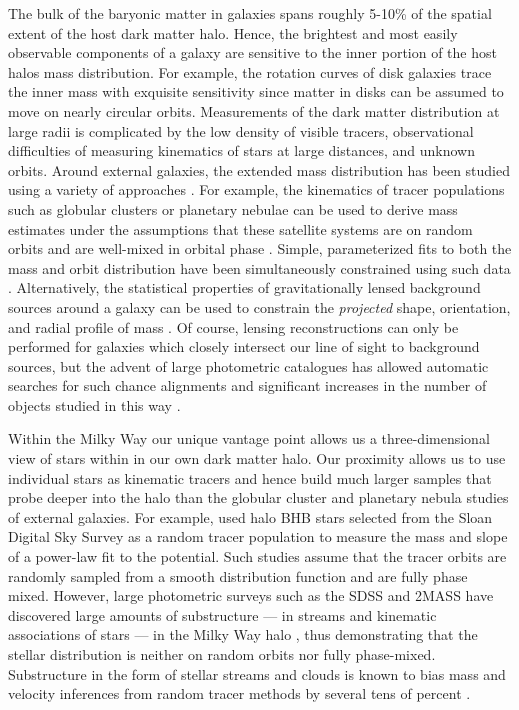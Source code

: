 \documentclass[letterpaper,12pt,preprint]{aastex}
\begin{document}
The bulk of the baryonic matter in galaxies spans roughly 5-10\% of the spatial extent of the host dark matter halo. Hence, the brightest and most easily observable components of a galaxy are sensitive to the inner portion of the host halos mass distribution. For example, the rotation curves of disk galaxies trace the inner mass with exquisite sensitivity since matter in disks can be assumed to move on nearly circular orbits. Measurements of the dark matter distribution at large radii is complicated by the low density of visible tracers, observational difficulties of measuring kinematics of stars at large distances, and unknown orbits. Around external galaxies, the extended mass distribution has been studied using a variety of approaches \citep[see][for a a complete and detailed review]{courteau13}. For example, the kinematics of tracer populations such as globular clusters or planetary nebulae can be used to derive mass estimates under the assumptions that these satellite systems are on random orbits and are well-mixed in orbital phase \citep[early investigations include][]{mendez01,cote03}. Simple, parameterized fits to both the mass and orbit distribution have been simultaneously constrained using such data \citep[e.g.][]{napolitano11,deason12c}. Alternatively, the statistical properties of gravitationally lensed background sources around a galaxy can be used to constrain the \emph{projected} shape, orientation, and radial profile of mass \citep[see, for example, the Lens Structure and Dynamics Survey described in][]{koopmans02}. Of course, lensing reconstructions can only be performed for galaxies which closely intersect our line of sight to background sources, but the advent of large photometric catalogues has allowed automatic searches for such chance alignments and significant increases in the number of objects studied in this way \citep[e.g. the Sloan Lens ACS Survey, see][]{bolton06}.

Within the Milky Way our unique vantage point allows us a three-dimensional view of stars within in our own dark matter halo. Our proximity allows us to use individual stars as kinematic tracers and hence build much larger samples that probe deeper into the halo than the globular cluster and planetary nebula studies of external galaxies. For example, \cite{deason12a} used halo BHB stars selected from the Sloan Digital Sky Survey \cite[SDSS;][]{york00} as a random tracer population to measure the mass and slope of a power-law fit to the potential. Such studies assume that the tracer orbits are randomly sampled from a smooth distribution function and are fully phase mixed. However, large photometric surveys such as the SDSS and 2MASS \citep{skrutskie06} have discovered large amounts of substructure --- in streams and kinematic associations of stars --- in the Milky Way halo \citep[e.g.,][]{belokurov06, rochapinto04}, thus demonstrating that the stellar distribution is neither on random orbits nor fully phase-mixed. Substructure in the form of stellar streams and clouds is known to bias mass and velocity inferences from random tracer methods by several tens of percent \citep{yencho06}.
\end{document}
